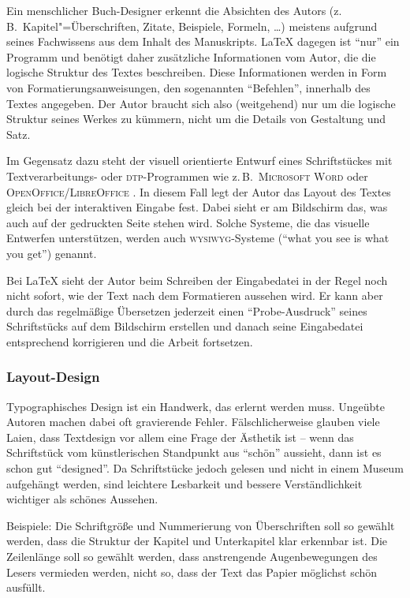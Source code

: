 Ein menschlicher Buch-Designer erkennt die Absichten des Autors
(z.\,B.\ Kapitel"=Überschriften, Zitate, Beispiele, Formeln,
\ldots) meistens aufgrund seines Fachwissens aus dem Inhalt des
Manuskripts.  \LaTeX{} dagegen ist \enquote{nur} ein Programm und
benötigt daher zusätzliche Informationen vom Autor, die die
logische Struktur des Textes beschreiben.
Diese Informationen werden in Form von Formatierungsanweisungen, den sogenannten \enquote{Befehlen}, innerhalb des Textes angegeben.
Der Autor braucht sich also (weitgehend) nur um die logische Struktur seines Werkes zu kümmern, nicht um die Details von Gestaltung und Satz.
 
Im Gegensatz dazu steht der visuell orientierte Entwurf eines
Schriftstückes mit Textverarbeitungs- oder \textsc{dtp}-Programmen wie z.\,B.\ 
\textsc{Microsoft Word} oder \textsc{OpenOffice/LibreOffice} .
In diesem Fall legt der Autor das Layout des Textes gleich bei der
interaktiven Eingabe fest. Dabei sieht er am Bildschirm das, was
auch auf der gedruckten Seite stehen wird. Solche Systeme, die das
visuelle Entwerfen unterstützen, werden auch \textsc{wysiwyg}-Systeme
(\enquote{what you see is what you get}) genannt.
 
Bei \LaTeX{} sieht der Autor beim Schreiben der Eingabedatei in
der Regel noch nicht sofort, wie der Text nach dem Formatieren 
aussehen wird. Er kann aber durch das regelmäßige Übersetzen jederzeit einen \enquote{Probe-Ausdruck} seines Schriftstücks auf dem
Bildschirm erstellen und danach seine Eingabedatei entsprechend 
korrigieren und die Arbeit fortsetzen.
 
 
\subsubsection{Layout-Design}
 
Typographisches Design ist ein Handwerk, das erlernt werden muss.
Ungeübte Autoren machen dabei oft gravierende Fehler.
Fälschlicherweise glauben viele Laien, dass Textdesign
vor allem eine Frage der Ästhetik ist -- wenn das
Schriftstück vom künstlerischen Standpunkt aus \enquote{schön}
aussieht, dann ist es schon gut \enquote{designed}.
Da Schriftstücke jedoch gelesen und nicht in einem Museum
aufgehängt werden, sind leichtere Lesbarkeit und bessere
Verständlichkeit wichtiger als schönes Aussehen.
 
Beispiele:
Die Schriftgröße und Nummerierung von Überschriften soll so
gewählt werden, dass die Struktur der Kapitel und Unterkapitel
klar erkennbar ist.
Die Zeilenlänge soll so gewählt werden, dass anstrengende
Augenbewegungen des Lesers vermieden werden, nicht so, dass der
Text das Papier möglichst schön ausfüllt.
 
